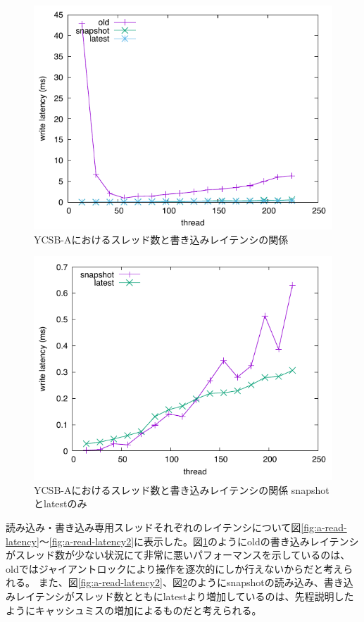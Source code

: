 \documentclass[a4paper]{jreport}	%
\begin{document}
\begin{figure}[h] 
\centering
\includegraphics[width=15cm]{ycsb-a/opposite-write-latency}
\caption{YCSB-Aにおけるスレッド数と書き込みレイテンシの関係}
\label{fig:a-write-latency}
\end{figure}

\begin{figure}[h] 
\centering
\includegraphics[width=15cm]{ycsb-a/opposite-write-latency2}
\caption{YCSB-Aにおけるスレッド数と書き込みレイテンシの関係 snapshotとlatestのみ}
\label{fig:a-write-latency2}
\end{figure}

読み込み・書き込み専用スレッドそれぞれのレイテンシについて図\ref{fig:a-read-latency}〜\ref{fig:a-read-latency2}に表示した。図\ref{fig:a-write-latency}のようにoldの書き込みレイテンシがスレッド数が少ない状況にて非常に悪いパフォーマンスを示しているのは、oldではジャイアントロックにより操作を逐次的にしか行えないからだと考えられる。
また、図\ref{fig:a-read-latency2}、図\ref{fig:a-write-latency2}のようにsnapshotの読み込み、書き込みレイテンシがスレッド数とともにlatestより増加しているのは、先程説明したようにキャッシュミスの増加によるものだと考えられる。
\end{document}
